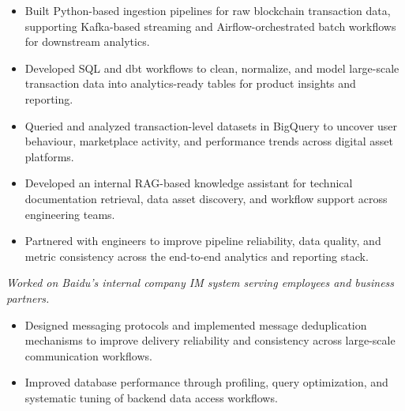 \documentclass{resume}
\begin{document}
\begin{itemize}[parsep=0.4ex]

\item Built Python-based ingestion pipelines for raw blockchain transaction data, supporting Kafka-based streaming and Airflow-orchestrated batch workflows for downstream analytics.

\item Developed SQL and dbt workflows to clean, normalize, and model large-scale transaction data into analytics-ready tables for product insights and reporting.

\item Queried and analyzed transaction-level datasets in BigQuery to uncover user behaviour, marketplace activity, and performance trends across digital asset platforms.

\item Developed an internal RAG-based knowledge assistant for technical documentation retrieval, data asset discovery, and workflow support across engineering teams.

\item Partnered with engineers to improve pipeline reliability, data quality, and metric consistency across the end-to-end analytics and reporting stack.

\end{itemize}



\textit{Worked on Baidu's internal company IM system serving employees and business partners.}
\begin{itemize}[parsep=0.4ex]

\item Designed messaging protocols and implemented message deduplication mechanisms to improve delivery reliability and consistency across large-scale communication workflows.


\item Improved database performance through profiling, query optimization, and systematic tuning of backend data access workflows.

\end{itemize}
\end{document}
